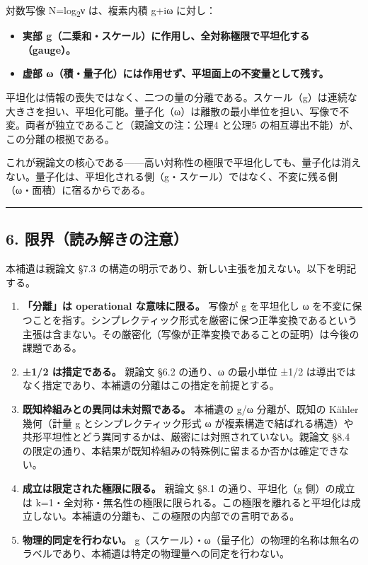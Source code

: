 \documentclass[11pt]{ltjsarticle}
\providecommand{\tightlist}{\setlength{\itemsep}{0pt}\setlength{\parskip}{0pt}}
\begin{document}
対数写像 N=log\textsubscript{2}ν は、複素内積 g+iω に対し：

\begin{itemize}
\tightlist
\item
  \textbf{実部
  g（二乗和・スケール）に作用し、全対称極限で平坦化する（gauge）。}
\item
  \textbf{虚部
  ω（積・量子化）には作用せず、平坦面上の不変量として残す。}
\end{itemize}

平坦化は情報の喪失ではなく、二つの量の分離である。スケール（g）は連続な大きさを担い、平坦化可能。量子化（ω）は離散の最小単位を担い、写像で不変。両者が独立であること（親論文の注：公理4
と公理5 の相互導出不能）が、この分離の根拠である。

これが親論文の核心である------高い対称性の極限で平坦化しても、量子化は消えない。量子化は、平坦化される側（g・スケール）ではなく、不変に残る側（ω・面積）に宿るからである。

\begin{center}\rule{0.5\linewidth}{0.5pt}\end{center}

\subsection{6.
限界（読み解きの注意）}\label{ux9650ux754cux8aadux307fux89e3ux304dux306eux6ce8ux610f}

本補遺は親論文 §7.3
の構造の明示であり、新しい主張を加えない。以下を明記する。

\begin{enumerate}
\def\labelenumi{\arabic{enumi}.}
\item
  \textbf{「分離」は operational な意味に限る。} 写像が g を平坦化し ω
  を不変に保つことを指す。シンプレクティック形式を厳密に保つ正準変換であるという主張は含まない。その厳密化（写像が正準変換であることの証明）は今後の課題である。
\item
  \textbf{±1/2 は措定である。} 親論文 §6.2 の通り、ω の最小単位 ±1/2
  は導出ではなく措定であり、本補遺の分離はこの措定を前提とする。
\item
  \textbf{既知枠組みとの異同は未対照である。} 本補遺の g/ω
  分離が、既知の Kähler 幾何（計量 g とシンプレクティック形式 ω
  が複素構造で結ばれる構造）や共形平坦性とどう異同するかは、厳密には対照されていない。親論文
  §8.4
  の限定の通り、本結果が既知枠組みの特殊例に留まるか否かは確定できない。
\item
  \textbf{成立は限定された極限に限る。} 親論文 §8.1 の通り、平坦化（g
  側）の成立は
  k=1・全対称・無名性の極限に限られる。この極限を離れると平坦化は成立しない。本補遺の分離も、この極限の内部での言明である。
\item
  \textbf{物理的同定を行わない。}
  g（スケール）・ω（量子化）の物理的名称は無名のラベルであり、本補遺は特定の物理量への同定を行わない。
\end{enumerate}
\end{document}
